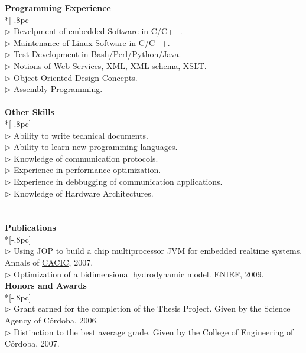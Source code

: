 \documentclass[a4paper,11pt,english]{article}
\begin{document}
{
{\large \bf Programming Experience} \\*[-.8pc]
\underline{\hspace{6in}} \\
$\triangleright$ Develpment of embedded Software in C/C++.\\
$\triangleright$ Maintenance of Linux Software in C/C++.\\
$\triangleright$ Test Development in Bash/Perl/Python/Java.\\
$\triangleright$ Notions of Web Services, XML, XML schema, XSLT.\\
$\triangleright$ Object Oriented Design Concepts.\\
$\triangleright$ Assembly Programming.\\
\\
{\large \bf Other Skills} \\*[-.8pc]
\underline{\hspace{6in}} \\
$\triangleright$ Ability to write technical documents.\\
$\triangleright$ Ability to learn new programming languages.\\
$\triangleright$ Knowledge of communication protocols.\\
$\triangleright$ Experience in performance optimization.\\
$\triangleright$ Experience in debbugging of communication applications.\\
$\triangleright$ Knowledge of Hardware Architectures.\\
 }
\\ \\
{\bf Publications} \\*[-.8pc]
\underline{\hspace{6in}} \\
$\triangleright$ Using JOP to build a chip multiprocessor JVM for embedded realtime systems. Annals of 
\href{http://www.cacic2007.unne.edu.ar/index.en.php}{CACIC}, 2007.\\
$\triangleright$ Optimization of a bidimensional hydrodynamic model. ENIEF, 2009.\\


{\bf Honors and Awards} \\*[-.8pc]
\underline{\hspace{6in}} \\
$\triangleright$ Grant earned for the completion of the Thesis Project.
Given by the Science Agency of C\'ordoba, 2006.\\ 
$\triangleright$ Distinction to the best average grade.
Given by the College of Engineering of C\'ordoba, 2007.\\
\end{document}
